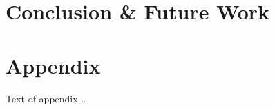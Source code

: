 \documentclass[acmsmall]{acmart}\settopmatter{}
\begin{document}
	\section{Conclusion \& Future Work}
	\label{sec:conclusion}
	
	
	\begin{acks}                            %
	\end{acks}
	
	
	
	
	\appendix
	\section{Appendix}
	
	Text of appendix \ldots
	
\end{document}
